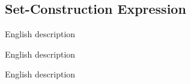 
\subsection{Set-Construction Expression}
{
	\lipsum[1]
	
	\begin{itemize}
	{
		\item[\texttt{code}] English description
		
		\item[\texttt{code}] English description
		
		\item[\texttt{code}] English description
	}
	\end{itemize}
}
